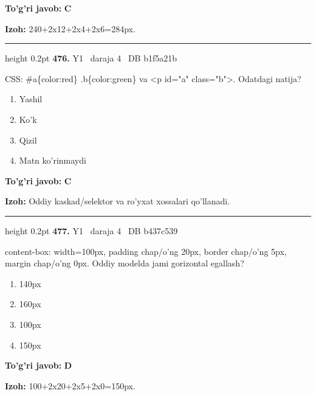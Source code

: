 \documentclass[10pt,a4paper,oneside]{article}
\begin{document}
\begin{tcolorbox}[enhanced,breakable,colback=teal!4,colframe=teal!45!black,boxrule=0.45pt,arc=1.2mm,left=2.8mm,right=2.8mm,top=2mm,bottom=2mm,before skip=2mm,after skip=2mm]
\textbf{\color{teal}To'g'ri javob:} \textbf{C}
\par\smallskip
\textbf{Izoh:} 240+2x12+2x4+2x6=284px.
\end{tcolorbox}
\vspace{2mm}\hrule height 0.2pt \vspace{4mm}
\hypertarget{q476}{\textbf{\color{ink}476.}}  {\color{muted}\scriptsize Y1 \textbullet\ daraja 4 \textbullet\ DB b1f5a21b}
\par
CSS: \#a\{color:red\} .b\{color:green\} va \textless{}p id="a" class="b"\textgreater{}. Odatdagi natija?
\begin{enumerate}[label=\Alph*),leftmargin=9mm]
\item Yashil
\item Ko'k
\item Qizil
\item Matn ko'rinmaydi
\end{enumerate}
\begin{tcolorbox}[enhanced,breakable,colback=teal!4,colframe=teal!45!black,boxrule=0.45pt,arc=1.2mm,left=2.8mm,right=2.8mm,top=2mm,bottom=2mm,before skip=2mm,after skip=2mm]
\textbf{\color{teal}To'g'ri javob:} \textbf{C}
\par\smallskip
\textbf{Izoh:} Oddiy kaskad/selektor va ro'yxat xossalari qo'llanadi.
\end{tcolorbox}
\vspace{2mm}\hrule height 0.2pt \vspace{4mm}
\hypertarget{q477}{\textbf{\color{ink}477.}}  {\color{muted}\scriptsize Y1 \textbullet\ daraja 4 \textbullet\ DB b437c539}
\par
content-box: width=100px, padding chap/o'ng 20px, border chap/o'ng 5px, margin chap/o'ng 0px. Oddiy modelda jami gorizontal egallash?
\begin{enumerate}[label=\Alph*),leftmargin=9mm]
\item 140px
\item 160px
\item 100px
\item 150px
\end{enumerate}
\begin{tcolorbox}[enhanced,breakable,colback=teal!4,colframe=teal!45!black,boxrule=0.45pt,arc=1.2mm,left=2.8mm,right=2.8mm,top=2mm,bottom=2mm,before skip=2mm,after skip=2mm]
\textbf{\color{teal}To'g'ri javob:} \textbf{D}
\par\smallskip
\textbf{Izoh:} 100+2x20+2x5+2x0=150px.
\end{tcolorbox}
\end{document}
